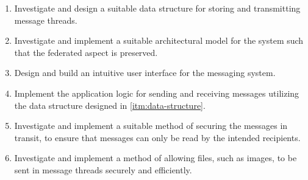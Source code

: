 \begin{enumerate}
  \item \label{itm:data-structure} Investigate and design a suitable data structure for storing and transmitting message threads.
  \item Investigate and implement a suitable architectural model for the system such that the federated aspect is preserved.
  \item Design and build an intuitive user interface for the messaging system.
  \item Implement the application logic for sending and receiving messages utilizing the data structure designed in \ref{itm:data-structure}.
  \item Investigate and implement a suitable method of securing the messages in transit, to ensure that messages can only be read by the intended recipients.
  \item Investigate and implement a method of allowing files, such as images, to be sent in message threads securely and efficiently.
\end{enumerate}